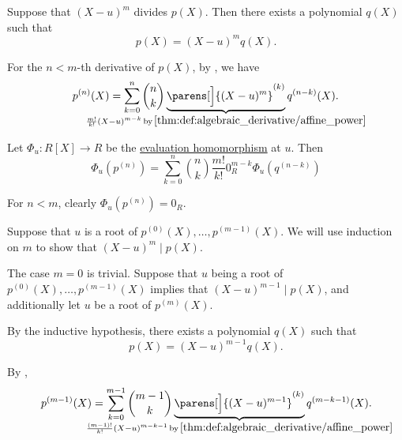 \begin{defproof}
   Suppose that \( (X - u)^m \) divides \( p(X) \). Then there exists a polynomial \( q(X) \) such that
  \begin{equation*}
    p(X) = (X - u)^m q(X).
  \end{equation*}

  For the \( n < m \)-th derivative of \( p(X) \), by , we have
  \begin{equation*}
    p^{(n)}(X) = \sum_{k=0}^n \binom n k \underbrace{\parens[\Big]{ (X - u)^m }^{(k)}}_{\mathclap{\frac {m!} {k!} (X - u)^{m-k} \T*{by} \ref{thm:def:algebraic_derivative/affine_power}}} q^{(n-k)}(X).
  \end{equation*}

  Let \( \Phi_u: R[X] \to R \) be the \hyperref[thm:polynomial_semiring_universal_property]{evaluation homomorphism} at \( u \). Then
  \begin{equation*}
    \Phi_u(p^{(n)}) = \sum_{k=0}^n \binom n k \frac {m!} {k!} 0_R^{m-k} \Phi_u(q^{(n-k)})
  \end{equation*}

  For \( n < m \), clearly \( \Phi_u(p^{(n)}) = 0_R \).

   Suppose that \( u \) is a root of \( p^{(0)}(X), \ldots, p^{(m-1)}(X) \). We will use induction on \( m \) to show that \( (X - u)^m \mid p(X) \).

  The case \( m = 0 \) is trivial. Suppose that \( u \) being a root of \( p^{(0)}(X), \ldots, p^{(m-1)}(X) \) implies that \( (X - u)^{m-1} \mid p(X) \), and additionally let \( u \) be a root of \( p^{(m)}(X) \).

  By the inductive hypothesis, there exists a polynomial \( q(X) \) such that
  \begin{equation*}
    p(X) = (X - u)^{m-1} q(X).
  \end{equation*}

  By ,
  \begin{equation*}
    p^{(m-1)}(X) = \sum_{k=0}^{m-1} \binom {m-1} k \underbrace{\parens[\Big]{ (X - u)^{m - 1} }^{(k)}}_{\mathclap{\frac {(m - 1)!} {k!} (X - u)^{m - k - 1} \T*{by} \ref{thm:def:algebraic_derivative/affine_power}}} q^{(m - k - 1)}(X).
  \end{equation*}


\end{defproof}
